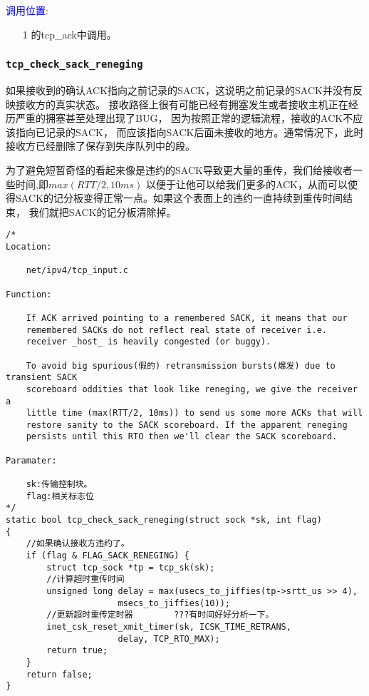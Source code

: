		\textcolor{blue}{调用位置}:
			\begin{enumerate}
				\item[1]		\label{ClientReceiveSYN+ACK:tcp_ack}的tcp\_ack中调用。
			\end{enumerate}

        \subsubsection{\texttt{tcp_check_sack_reneging}}
            如果接收到的确认ACK指向之前记录的SACK，这说明之前记录的SACK并没有反映接收方的真实状态。
            接收路径上很有可能已经有拥塞发生或者接收主机正在经历严重的拥塞甚至处理出现了BUG，
            因为按照正常的逻辑流程，接收的ACK不应该指向已记录的SACK，
            而应该指向SACK后面未接收的地方。通常情况下，此时接收方已经删除了保存到失序队列中的段。
            
            为了避免短暂奇怪的看起来像是违约的SACK导致更大量的重传，我们给接收者一些时间,即$max(RTT/2, 10ms)$
            以便于让他可以给我们更多的ACK，从而可以使得SACK的记分板变得正常一点。如果这个表面上的违约一直持续到重传时间结束，
            我们就把SACK的记分板清除掉。

\begin{verbatim}
/*
Location:

    net/ipv4/tcp_input.c

Function:

    If ACK arrived pointing to a remembered SACK, it means that our
    remembered SACKs do not reflect real state of receiver i.e.
    receiver _host_ is heavily congested (or buggy).

    To avoid big spurious(假的) retransmission bursts(爆发) due to transient SACK
    scoreboard oddities that look like reneging, we give the receiver a
    little time (max(RTT/2, 10ms)) to send us some more ACKs that will
    restore sanity to the SACK scoreboard. If the apparent reneging
    persists until this RTO then we'll clear the SACK scoreboard.

Paramater:

    sk:传输控制块。
    flag:相关标志位
*/
static bool tcp_check_sack_reneging(struct sock *sk, int flag)
{
    //如果确认接收方违约了。
    if (flag & FLAG_SACK_RENEGING) {
        struct tcp_sock *tp = tcp_sk(sk);
        //计算超时重传时间
        unsigned long delay = max(usecs_to_jiffies(tp->srtt_us >> 4),
                      msecs_to_jiffies(10));
        //更新超时重传定时器        ???有时间好好分析一下。
        inet_csk_reset_xmit_timer(sk, ICSK_TIME_RETRANS,
                      delay, TCP_RTO_MAX);
        return true;
    }
    return false;
}
\end{verbatim}
